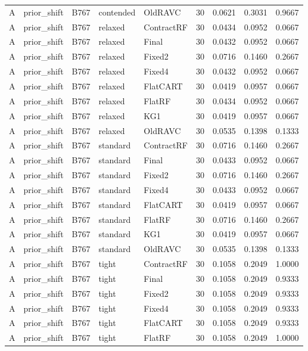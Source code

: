 \begin{longtable}{@{}lllllllll@{}}
A & prior\_shift & B767 & contended & OldRAVC & 30 & 0.0621 & 0.3031 & 0.9667\\
A & prior\_shift & B767 & relaxed & ContractRF & 30 & 0.0434 & 0.0952 & 0.0667\\
A & prior\_shift & B767 & relaxed & Final & 30 & 0.0432 & 0.0952 & 0.0667\\
A & prior\_shift & B767 & relaxed & Fixed2 & 30 & 0.0716 & 0.1460 & 0.2667\\
A & prior\_shift & B767 & relaxed & Fixed4 & 30 & 0.0432 & 0.0952 & 0.0667\\
A & prior\_shift & B767 & relaxed & FlatCART & 30 & 0.0419 & 0.0957 & 0.0667\\
A & prior\_shift & B767 & relaxed & FlatRF & 30 & 0.0434 & 0.0952 & 0.0667\\
A & prior\_shift & B767 & relaxed & KG1 & 30 & 0.0419 & 0.0957 & 0.0667\\
A & prior\_shift & B767 & relaxed & OldRAVC & 30 & 0.0535 & 0.1398 & 0.1333\\
A & prior\_shift & B767 & standard & ContractRF & 30 & 0.0716 & 0.1460 & 0.2667\\
A & prior\_shift & B767 & standard & Final & 30 & 0.0433 & 0.0952 & 0.0667\\
A & prior\_shift & B767 & standard & Fixed2 & 30 & 0.0716 & 0.1460 & 0.2667\\
A & prior\_shift & B767 & standard & Fixed4 & 30 & 0.0433 & 0.0952 & 0.0667\\
A & prior\_shift & B767 & standard & FlatCART & 30 & 0.0419 & 0.0957 & 0.0667\\
A & prior\_shift & B767 & standard & FlatRF & 30 & 0.0716 & 0.1460 & 0.2667\\
A & prior\_shift & B767 & standard & KG1 & 30 & 0.0419 & 0.0957 & 0.0667\\
A & prior\_shift & B767 & standard & OldRAVC & 30 & 0.0535 & 0.1398 & 0.1333\\
A & prior\_shift & B767 & tight & ContractRF & 30 & 0.1058 & 0.2049 & 1.0000\\
A & prior\_shift & B767 & tight & Final & 30 & 0.1058 & 0.2049 & 0.9333\\
A & prior\_shift & B767 & tight & Fixed2 & 30 & 0.1058 & 0.2049 & 0.9333\\
A & prior\_shift & B767 & tight & Fixed4 & 30 & 0.1058 & 0.2049 & 0.9333\\
A & prior\_shift & B767 & tight & FlatCART & 30 & 0.1058 & 0.2049 & 0.9333\\
A & prior\_shift & B767 & tight & FlatRF & 30 & 0.1058 & 0.2049 & 1.0000\\

\end{longtable}

